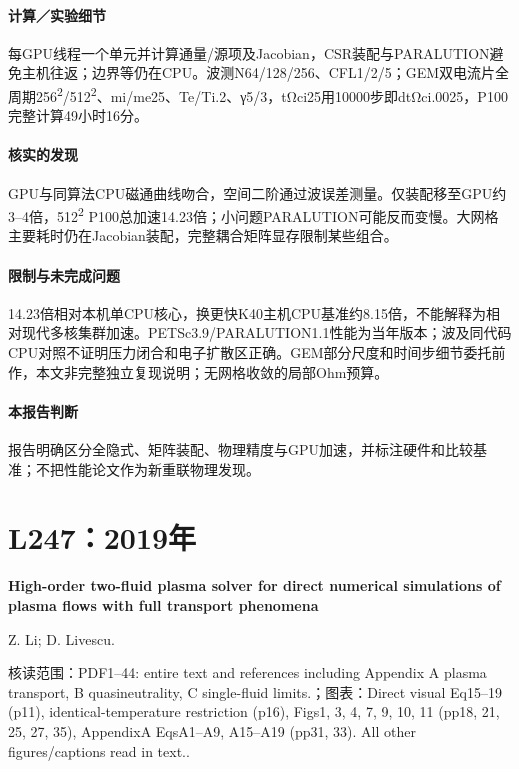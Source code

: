 \paragraph{计算／实验细节}每GPU线程一个单元并计算通量/源项及Jacobian，CSR装配与PARALUTION避免主机往返；边界等仍在CPU。波测N64/128/256、CFL1/2/5；GEM双电流片全周期256\textsuperscript{2}/512\textsuperscript{2}、mi/me25、Te/Ti.2、γ5/3，tΩci25用10000步即dtΩci.0025，P100完整计算49小时16分。

\paragraph{核实的发现}GPU与同算法CPU磁通曲线吻合，空间二阶通过波误差测量。仅装配移至GPU约3–4倍，512\textsuperscript{2} P100总加速14.23倍；小问题PARALUTION可能反而变慢。大网格主要耗时仍在Jacobian装配，完整耦合矩阵显存限制某些组合。

\paragraph{限制与未完成问题}14.23倍相对本机单CPU核心，换更快K40主机CPU基准约8.15倍，不能解释为相对现代多核集群加速。PETSc3.9/PARALUTION1.1性能为当年版本；波及同代码CPU对照不证明压力闭合和电子扩散区正确。GEM部分尺度和时间步细节委托前作，本文非完整独立复现说明；无网格收敛的局部Ohm预算。

\paragraph{本报告判断}报告明确区分全隐式、矩阵装配、物理精度与GPU加速，并标注硬件和比较基准；不把性能论文作为新重联物理发现。

\section{L247：2019年}\label{paper:L247}

\textbf{High-order two-fluid plasma solver for direct numerical simulations of plasma flows with full transport phenomena}\citep{L247}\

Z. Li;  D. Livescu.

\textsf{核读范围：}PDF1–44: entire text and references including Appendix A plasma transport,  B quasineutrality,  C single-fluid limits.；\textsf{图表：}Direct visual Eq15–19 (p11),  identical-temperature restriction (p16),  Figs1, 3, 4, 7, 9, 10, 11 (pp18, 21, 25, 27, 35),  AppendixA EqsA1–A9, A15–A19 (pp31, 33). All other figures/captions read in text..

